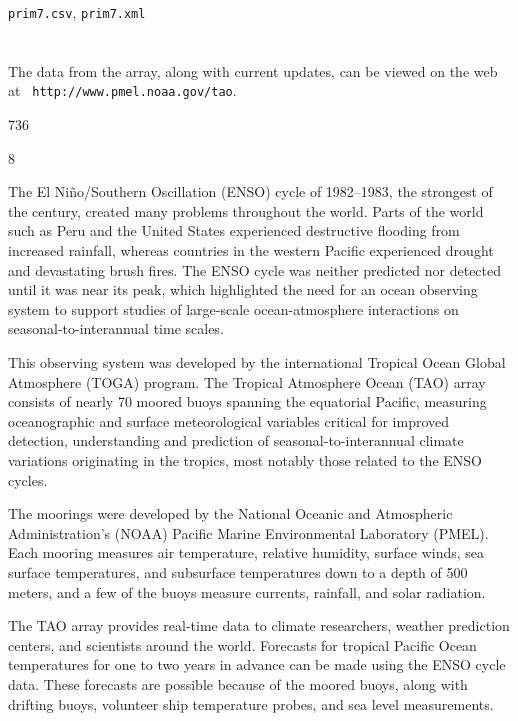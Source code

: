 \bigskip
{}

\smallskip
{\tt prim7.csv}, {\tt prim7.xml}

\newpage
{}
\section{}

 The data from the array, along with
current updates, can be viewed on the web at {\tt
http://www.pmel.noaa.gov/tao}.

\bigskip
{} 736

 8

\smallskip
{} The El Ni\~no/Southern Oscillation (ENSO)
cycle of 1982--1983, the strongest of the century, created many
problems throughout the world.  Parts of the world such as Peru and
the United States experienced destructive flooding from increased
rainfall, whereas countries in the western Pacific experienced drought
and devastating brush fires.  The ENSO cycle was neither predicted nor
detected until it was near its peak, which highlighted the need for an
ocean observing system to support studies of large-scale
ocean-atmosphere interactions on seasonal-to-interannual time scales.

This observing system was developed by the international Tropical
Ocean Global Atmosphere (TOGA) program. The Tropical Atmosphere Ocean
(TAO) array consists of nearly 70 moored buoys spanning the equatorial
Pacific, measuring oceanographic and surface meteorological variables
critical for improved detection, understanding and prediction of
seasonal-to-interannual climate variations originating in the tropics,
most notably those related to the ENSO cycles.

The moorings were developed by the National Oceanic and Atmospheric
Administration's (NOAA) Pacific Marine Environmental Laboratory
(PMEL).  Each mooring measures air temperature, relative humidity,
surface winds, sea surface temperatures, and subsurface temperatures
down to a depth of 500 meters, and a few of the buoys measure
currents, rainfall, and solar radiation. 

The TAO array provides real-time data to climate researchers, weather
prediction centers, and scientists around the world.  Forecasts for
tropical Pacific Ocean temperatures for one to two years in advance
can be made using the ENSO cycle data. These forecasts are possible
because of the moored buoys, along with drifting buoys, volunteer ship
temperature probes, and sea level measurements.

